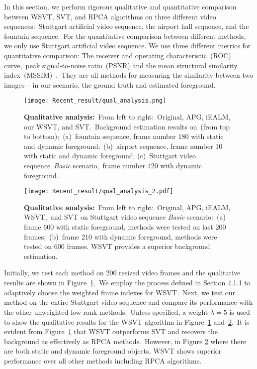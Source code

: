 \documentclass[twoside,11pt]{article}
\begin{document}
In this section, we perform rigorous qualitative and quantitative comparison between WSVT, SVT, and RPCA algorithms on three different video sequences:~Stuttgart artificial video sequence, the airport hall sequence, and the fountain sequence.~For the quantitative comparison between different methods, we only use Stuttgart artificial video sequence. We use three different metrics for quantitative comparison: The receiver and operating characteristic~(ROC) curve,~peak signal-to-noise ratio~(PSNR) and the mean structural similarity index~(MSSIM)~\citep{mssim}.~They are all methods for measuring the similarity between two images -- in our scenario, the ground truth and estimated foreground.
\begin{figure}
	\centering 
	\texttt{[image: Recent\_result/qual\_analysis.png]}
	\caption{{\bf Qualitative analysis:}~From left to right:~Original, APG, iEALM, our WSVT, and SVT.~Background estimation results on~(from top to bottom):~(a)~fountain sequence, frame number 180 with static and dynamic foreground;~(b)~airport sequence, frame number 10 with static and dynamic foreground; (c)~Stuttgart video sequence~{\it Basic} scenario,~frame number 420 with dynamic foreground.}\label{qual_bg}
\end{figure}  

\begin{figure}
	\centering  \texttt{[image: Recent\_result/qual\_analysis\_2.pdf]}
	\caption{{\bf Qualitative analysis:}~From left to right:~Original, APG, iEALM, WSVT,~and SVT on Stuttgart video sequence {\it Basic} scenario:~(a) frame 600 with static foreground, methods were tested on last 200 frames;~(b)~frame 210 with dynamic foreground, methods were tested on 600 frames. WSVT provides a superior background estimation.}\label{qual_bg_2}
\end{figure}

Initially, we test each method on 200 resized video frames and the qualitative results are shown in Figure~\ref{qual_bg}.~We employ the process defined in Section 4.1.1 to adaptively choose the weighted frame indexes for WSVT.~Next, we test our method on the entire Stuttgart video sequence and compare its performance with the other unweighted low-rank methods.~Unless specified, a weight $\tilde{\lambda}=5$ is used to show the qualitative results for the WSVT algorithm in Figure~\ref{qual_bg} and~\ref{qual_bg_2}.~It is evident from Figure~\ref{qual_bg} that WSVT outperforms SVT and recovers the background as effectively as RPCA methods.~However, in Figure \ref{qual_bg_2} where there are both static and dynamic foreground objects, WSVT shows superior performance over all other methods including RPCA algorithms.
\end{document}
